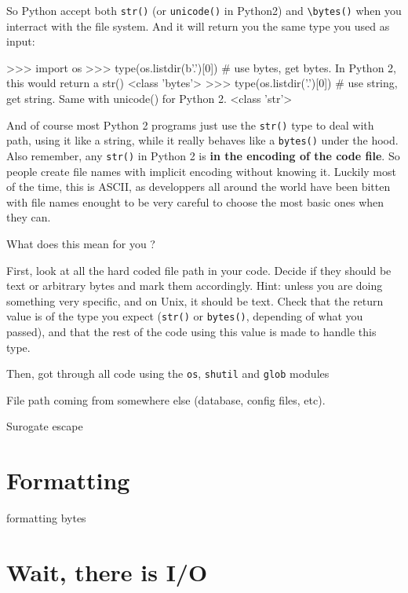 So Python accept both \lstinline{str()} (or \lstinline{unicode()} in Python2) and \lstinline{\bytes()} when you interract with the file system. And it will return you the same type you used as input:

\begin{py3}
>>> import os
>>> type(os.listdir(b'.')[0]) # use bytes, get bytes. In Python 2, this would return a str()
<class 'bytes'>
>>> type(os.listdir('.')[0]) # use string, get string. Same with unicode() for Python 2.
<class 'str'>
\end{py3}

And of course most Python 2 programs just use the \lstinline{str()} type to deal with path, using it like a string, while it really behaves like a \lstinline{bytes()} under the hood. Also remember, any \lstinline{str()} in Python 2 is \textbf{in the encoding of the code file}. So people create file names with implicit encoding without knowing it. Luckily most of the time, this is ASCII, as developpers all around the world have been bitten with file names enought to be very careful to choose the most basic ones when they can.

What does this mean for you ?

First, look at all the hard coded file path in your code. Decide if they should be text or arbitrary bytes and mark them accordingly. Hint: unless you are doing something very specific, and on Unix, it should be text. Check that the return value is of the type you expect (\lstinline{str()} or \lstinline{bytes()}, depending of what you passed), and that the rest of the code using this value is made to handle this type.

Then, got through all code using the \lstinline{os}, \lstinline{shutil} and \lstinline{glob} modules

File path coming from somewhere else (database, config files, etc).

Surogate escape

\section{Formatting}


formatting bytes

\section{Wait, there is I/O}


